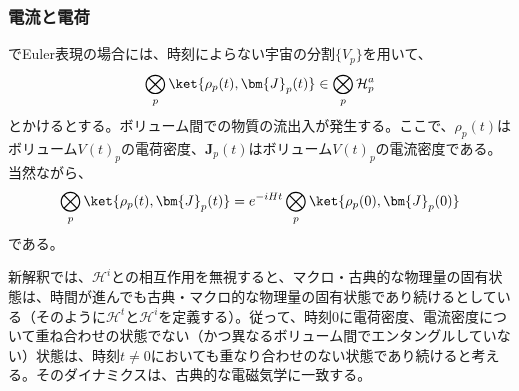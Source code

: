 \subsubsection{電流と電荷}
でEuler表現の場合には、時刻によらない宇宙の分割$\{V_p\}$を用いて、
\begin{equation}
    \label{eq:euler_classical_fluid_state}
    \bigotimes_p \ket{\rho_p(t),\bm{J}_p(t)} \in \bigotimes_p \mathcal{H}_p^a
\end{equation}
とかけるとする。ボリューム間での物質の流出入が発生する。ここで、$\rho_p(t)$はボリューム$V(t)_p$の電荷密度、$\bm{J}_p(t)$はボリューム$V(t)_p$の電流密度である。
当然ながら、
\begin{equation}
    \bigotimes_p \ket{\rho_p(t),\bm{J}_p(t)} = e^{-iHt}\bigotimes_p \ket{\rho_p(0),\bm{J}_p(0)}
\end{equation}
である。\par
新解釈では、$\mathcal{H}^i$との相互作用を無視すると、マクロ・古典的な物理量の固有状態は、時間が進んでも古典・マクロ的な物理量の固有状態であり続けるとしている（そのように$\mathcal{H}^t$と$\mathcal{H}^i$を定義する）。従って、時刻$0$に電荷密度、電流密度について重ね合わせの状態でない（かつ異なるボリューム間でエンタングルしていない）状態は、時刻$t \neq 0$においても重なり合わせのない状態であり続けると考える。そのダイナミクスは、古典的な電磁気学に一致する。